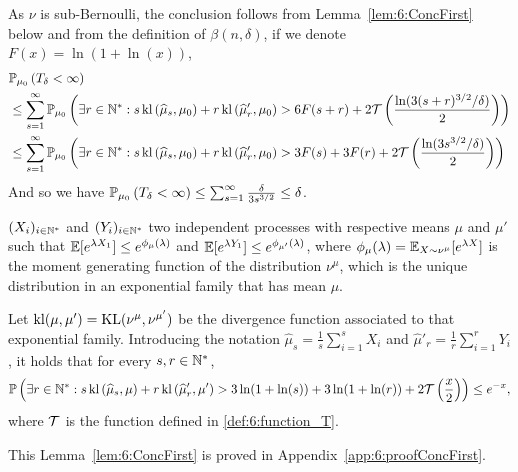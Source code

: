 \begin{smallproof}
As $\nu$ is sub-Bernoulli, the conclusion follows from Lemma~\ref{lem:6:ConcFirst} below and from the definition of $\beta(n,\delta)$, if we denote $F(x)=\ln(1+\ln(x))$,
%
\begin{align*}
    &\mathbb{P}_{\mu_0}\left(T_{\delta} < \infty\right) \\
    & \leq \sum_{s =1}^{\infty} \mathbb{P}_{\mu_0}\left(\exists r \in \mathbb{N}^* : s \, \mathrm{kl}\left(\widehat{\mu}_{s},\mu_0\right) + r \, \mathrm{kl}\left(\widehat{\mu}'_{r},\mu_0\right) > 6F(s+r)+ 2 \mathcal{T}\left(\frac{\ln(3(s+r)^{3/2}/\delta)}{2}\right)\right)\\
    & \leq \sum_{s =1}^{\infty} \mathbb{P}_{\mu_0}\left(\exists r \in \mathbb{N}^* : s \, \mathrm{kl}\left(\widehat{\mu}_{s},\mu_0\right) + r \, \mathrm{kl}\left(\widehat{\mu}'_{r},\mu_0\right) > 3F(s)+3F(r) + 2 \mathcal{T}\left(\frac{\ln(3s^{3/2}/\delta)}{2}\right)\right)
\end{align*}
%
And so we have $\mathbb{P}_{\mu_0}\left(T_{\delta} < \infty\right) \leq \sum_{s =1}^{\infty} \frac{\delta}{3s^{3/2}} \leq \delta$.
%
\end{smallproof}

\begin{lemma}\label{lem:6:ConcFirst}
\begin{leftbar}[lemmabar]  %
    $(X_i)_{i \in \mathbb{N}^*}$ and $(Y_i)_{i \in \mathbb{N}^*}$ two independent \iid{} processes with respective means $\mu$ and $\mu'$ such that
    $\mathbb{E}[e^{\lambda X_1}] \leq e^{\phi_{\mu}(\lambda)}$ and $\mathbb{E}[e^{\lambda Y_1}] \leq e^{\phi_{\mu'}(\lambda)}$,
    where $\phi_\mu(\lambda) = \mathbb{E}_{X \sim \nu^{\mu}}[e^{\lambda X}]$ is the moment generating function of the distribution $\nu^\mu$, which is the unique distribution in an exponential family that has mean $\mu$.

    Let $\mathrm{kl}(\mu,\mu') = \mathrm{KL}(\nu^\mu,\nu^{\mu'})$ be the divergence function associated to that exponential family. Introducing the notation $\widehat{\mu}_s = \frac{1}{s}\sum\limits_{i=1}^s X_i$ and $\widehat{\mu}'_r = \frac{1}{r}\sum\limits_{i=1}^r Y_i$, it holds that for every $s,r \in \mathbb{N}^*$,
    \[\mathbb{P}\left(\exists r \in \mathbb{N}^* : s \, \mathrm{kl}\left(\widehat{\mu}_{s},\mu\right) + r \, \mathrm{kl}\left(\widehat{\mu}_r',\mu'\right) > 3\ln(1+\ln(s)) + 3\ln(1+\ln(r)) + 2\mathcal{T}\left(\frac{x}{2}\right)\right)\leq e^{-x},\]
    where $\mathcal{T}$ is the function defined in \eqref{def:6:function_T}.
\end{leftbar}  %
\end{lemma}
\begin{smallproof}
    This Lemma~\ref{lem:6:ConcFirst} is proved in Appendix~\ref{app:6:proofConcFirst}.
\end{smallproof}


